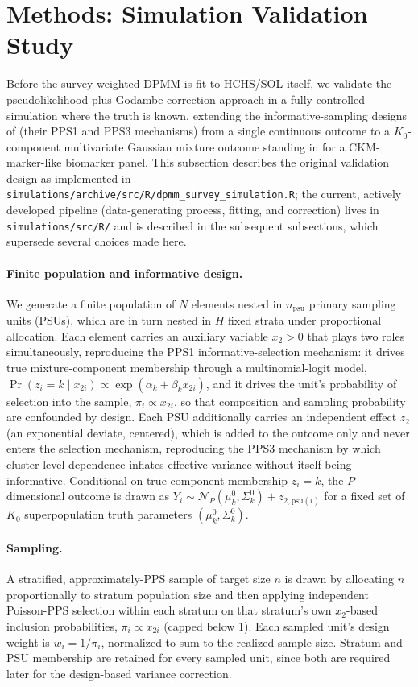 \documentclass[11pt]{article}
\begin{document}
\section{Methods: Simulation Validation Study}

Before the survey-weighted DPMM is fit to HCHS/SOL itself, we validate the pseudolikelihood-plus-Godambe-correction approach in a fully controlled simulation where the truth is known, extending the informative-sampling designs of \citet{williamssavitsky2021uncertainty} (their PPS1 and PPS3 mechanisms) from a single continuous outcome to a $K_0$-component multivariate Gaussian mixture outcome standing in for a CKM-marker-like biomarker panel. This subsection describes the original validation design as implemented in \texttt{simulations/archive/src/R/dpmm\_survey\_simulation.R}; the current, actively developed pipeline (data-generating process, fitting, and correction) lives in \texttt{simulations/src/R/} and is described in the subsequent subsections, which supersede several choices made here.

\paragraph{Finite population and informative design.} We generate a finite population of $N$ elements nested in $n_{\text{psu}}$ primary sampling units (PSUs), which are in turn nested in $H$ fixed strata under proportional allocation. Each element carries an auxiliary variable $x_2 > 0$ that plays two roles simultaneously, reproducing the PPS1 informative-selection mechanism: it drives true mixture-component membership through a multinomial-logit model, $\Pr(z_i = k \mid x_{2i}) \propto \exp(\alpha_k + \beta_k x_{2i})$, and it drives the unit's probability of selection into the sample, $\pi_i \propto x_{2i}$, so that composition and sampling probability are confounded by design. Each PSU additionally carries an independent effect $z_2$ (an exponential deviate, centered), which is added to the outcome only and never enters the selection mechanism, reproducing the PPS3 mechanism by which cluster-level dependence inflates effective variance without itself being informative. Conditional on true component membership $z_i = k$, the $P$-dimensional outcome is drawn as $Y_i \sim \mathcal{N}_P(\mu^0_k, \Sigma^0_k) + z_{2,\text{psu}(i)}$ for a fixed set of $K_0$ superpopulation truth parameters $(\mu^0_k, \Sigma^0_k)$.

\paragraph{Sampling.} A stratified, approximately-PPS sample of target size $n$ is drawn by allocating $n$ proportionally to stratum population size and then applying independent Poisson-PPS selection within each stratum on that stratum's own $x_2$-based inclusion probabilities, $\pi_i \propto x_{2i}$ (capped below 1). Each sampled unit's design weight is $w_i = 1/\pi_i$, normalized to sum to the realized sample size. Stratum and PSU membership are retained for every sampled unit, since both are required later for the design-based variance correction.
\end{document}
